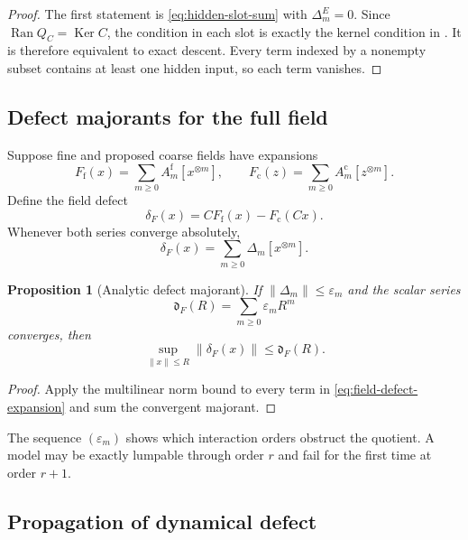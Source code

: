 \documentclass[11pt]{article}
\newtheorem{proposition}[theorem]{Proposition}
\theoremstyle{definition}
\theoremstyle{remark}
\newcommand{\Ran}{\operatorname{Ran}}
\newcommand{\Ker}{\operatorname{Ker}}
\newcommand{\norm}[1]{\left\lVert #1\right\rVert}
\newcommand{\fine}{\mathrm f}
\newcommand{\coarse}{\mathrm c}
\begin{document}
\begin{proof}
The first statement is \eqref{eq:hidden-slot-sum} with $\Delta_m^E=0$.  Since $\Ran Q_C=\Ker C$, the condition in each slot is exactly the kernel condition in .  It is therefore equivalent to exact descent.  Every term indexed by a nonempty subset contains at least one hidden input, so each term vanishes.
\end{proof}

\subsection{Defect majorants for the full field}
Suppose fine and proposed coarse fields have expansions
\[
  F_{\fine}(x)=\sum_{m\geq0}A_m^{\fine}[x^{\otimes m}],
  \qquad
  F_{\coarse}(z)=\sum_{m\geq0}A_m^{\coarse}[z^{\otimes m}].
\]
Define the field defect
\begin{equation}\label{eq:field-defect}
  \delta_F(x)
  =
  CF_{\fine}(x)-F_{\coarse}(Cx).
\end{equation}
Whenever both series converge absolutely,
\begin{equation}\label{eq:field-defect-expansion}
  \delta_F(x)
  =
  \sum_{m\geq0}\Delta_m[x^{\otimes m}].
\end{equation}

\begin{proposition}[Analytic defect majorant]\label{prop:defect-majorant}
If $\norm{\Delta_m}\leq\varepsilon_m$ and the scalar series
\[
  \mathfrak d_F(R)=\sum_{m\geq0}\varepsilon_mR^m
\]
converges, then
\begin{equation}\label{eq:field-defect-majorant}
  \boxed{
  \sup_{\norm{x}\leq R}\norm{\delta_F(x)}
  \leq
  \mathfrak d_F(R).}
\end{equation}
\end{proposition}

\begin{proof}
Apply the multilinear norm bound to every term in \eqref{eq:field-defect-expansion} and sum the convergent majorant.
\end{proof}

The sequence $(\varepsilon_m)$ shows which interaction orders obstruct the quotient.  A model may be exactly lumpable through order $r$ and fail for the first time at order $r+1$.

\subsection{Propagation of dynamical defect}
\end{document}
